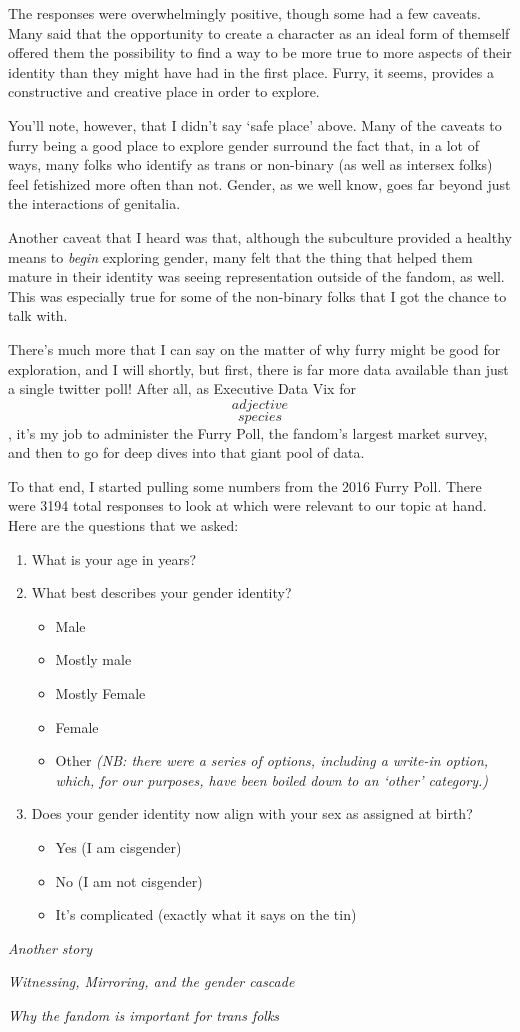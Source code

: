 The responses were overwhelmingly positive, though some had a few caveats.  Many said that the opportunity to create a character as an ideal form of themself offered them the possibility to find a way to be more true to more aspects of their identity than they might have had in the first place.  Furry, it seems, provides a constructive and creative place in order to explore.

You'll note, however, that I didn't say `safe place' above.  Many of the caveats to furry being a good place to explore gender surround the fact that, in a lot of ways, many folks who identify as trans or non-binary (as well as intersex folks) feel fetishized more often than not.  Gender, as we well know, goes far beyond just the interactions of genitalia.

Another caveat that I heard was that, although the subculture provided a healthy means to \textit{begin} exploring gender, many felt that the thing that helped them mature in their identity was seeing representation outside of the fandom, as well.  This was especially true for some of the non-binary folks that I got the chance to talk with.

There's much more that I can say on the matter of why furry might be good for exploration, and I will shortly, but first, there is far more data available than just a single twitter poll!  After all, as Executive Data Vix for \[adjective\]\[species\], it's my job to administer the Furry Poll, the fandom's largest market survey, and then to go for deep dives into that giant pool of data.

To that end, I started pulling some numbers from the 2016 Furry Poll.  There were 3194 total responses to look at which were relevant to our topic at hand.  Here are the questions that we asked:

\begin{enumerate}
  \item What is your age in years?
  \item What best describes your gender identity?
  \begin{itemize}
    \item Male
    \item Mostly male
    \item Mostly Female
    \item Female
    \item Other \textit{(NB: there were a series of options, including a write-in option, which, for our purposes, have been boiled down to an `other' category.)}
  \end{itemize}
  \item Does your gender identity now align with your sex as assigned at birth?
  \begin{itemize}
    \item Yes (I am cisgender)
    \item No (I am not cisgender)
    \item It's complicated (exactly what it says on the tin)
  \end{itemize}
\end{enumerate}

\secdiv

\textit{Another story}

\secdiv

\textit{Witnessing, Mirroring, and the gender cascade}

\textit{Why the fandom is important for trans folks}
